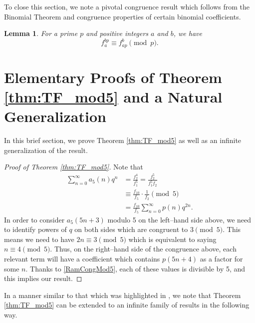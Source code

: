 \documentclass[10pt, reqno]{amsart}
\theoremstyle{theorem}
\newtheorem{lemma}[theorem]{Lemma}
\theoremstyle{definition}
\theoremstyle{example}
\begin{document}


To close this section, we note a pivotal congruence result which follows from the Binomial Theorem and congruence properties of certain binomial coefficients.  
\begin{lemma} 
\label{lem:FD} 
For a prime $p$ and positive integers $a$ and $b$, we have 
$$
f_a^{bp} \equiv f_{ap}^b \pmod{p}.  
$$
\end{lemma}  


\section{Elementary Proofs of Theorem \ref{thm:TF_mod5} and a Natural Generalization}
\label{sec:proofs5}

In this brief section, we prove Theorem \ref{thm:TF_mod5} as well as an infinite generalization of the result.   

\begin{proof}[Proof of Theorem \ref{thm:TF_mod5}]
Note that 
\begin{align*}
\sum_{n=0}^\infty a_5(n)q^n 
&=
\frac{f_2^4}{f_1^5} 
= 
\frac{f_2^5}{f_1^5f_2} \\
&\equiv 
\frac{f_{10}}{f_{5}}\cdot \frac{1}{f_2} \pmod{5}\\
&= 
\frac{f_{10}}{f_{5}}\sum_{n=0}^\infty p(n)q^{2n}.
\end{align*}
In order to consider $a_5(5n+3)$ modulo 5 on the left--hand side above, we need to identify powers of $q$ on both sides which are congruent to $3 \pmod{5}$.  This means we need to have $2n\equiv 3 \pmod{5}$ which is equivalent to saying $n\equiv 4 \pmod{5}$.  Thus, on the right--hand side of the congruence above, each relevant term will have a coefficient which contains $p(5n+4)$ as a factor for some $n$.  Thanks to \eqref{RamCongMod5}, each of these values is divisible by 5, and this implies our result.  
\end{proof}

In a manner similar to that which was highlighted in \cite{HS2025}, we note that Theorem \ref{thm:TF_mod5} can be extended to an infinite family of results in the following way.  
\end{document}
